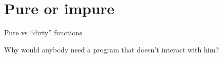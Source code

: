 \documentclass[aspectratio=169]{beamer}
\newcommand{\style}[1]{\ttfamily#1}
\begin{document}
\begin{frame}[fragile]
  
  \vspace{1.5cm}
  
\end{frame}

\begin{frame}[fragile]
  
  \vspace{1.5cm}
  
\end{frame}

\begin{frame}[fragile]
  
  \vspace{1.5cm}
  
\end{frame}


\begin{frame}[fragile]
  
\end{frame}

\begin{frame}[fragile]
  
\end{frame}

\section{Pure or impure}

\begin{frame}
\centering
\Huge
Pure vs ``dirty'' functions
\end{frame}

\begin{frame}[fragile]
  
\end{frame}

\begin{frame}[fragile]
  
\end{frame}

\begin{frame}[fragile]
  
\end{frame}

\begin{frame}
Why would anybody need a program that doesn't interact with him?
\end{frame}
\end{document}
